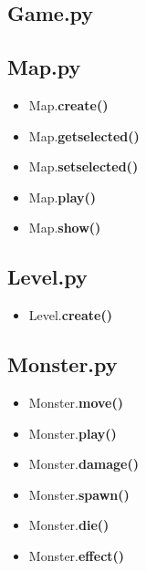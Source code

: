 \documentclass[a4paper]{article}
\begin{document}
        \subsection{Game.py}
            \begin{alltt}
                
            \end{alltt}

        \subsection{Map.py}
            \begin{itemize}
                \item Map.\textbf{create()}
                \item Map.\textbf{getselected()}
                \item Map.\textbf{setselected()}
                \item Map.\textbf{play()}
                \item Map.\textbf{show()}
            \end{itemize}

        \subsection{Level.py}
            \begin{itemize}
                \item Level.\textbf{create()}
            \end{itemize}

        \subsection{Monster.py}
            \begin{itemize}
                \item Monster.\textbf{move()}
                \item Monster.\textbf{play()}
                \item Monster.\textbf{damage()}
                \item Monster.\textbf{spawn()}
                \item Monster.\textbf{die()}
                \item Monster.\textbf{effect()}

            \end{itemize}
\end{document}
